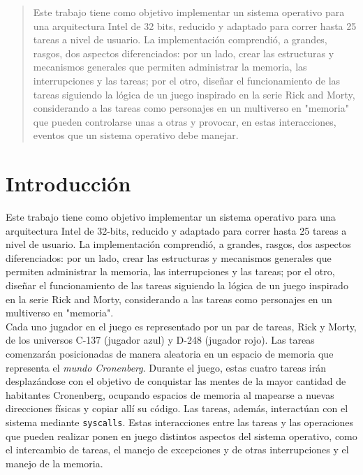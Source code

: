 \documentclass[a4paper]{article}
\begin{document}
\thispagestyle{empty}

\maketitle
\newpage

\thispagestyle{empty}
\vfill
\begin{abstract}
Este trabajo tiene como objetivo implementar un sistema operativo para una arquitectura Intel de 32 bits, reducido y adaptado para correr hasta 25 tareas a nivel de usuario. La implementación comprendió, a grandes, rasgos, dos aspectos diferenciados: por un lado, crear las estructuras y mecanismos generales que permiten administrar la memoria, las interrupciones y las tareas; por el otro, diseñar el funcionamiento de las tareas siguiendo la lógica de un juego inspirado en la serie Rick and Morty, considerando a las tareas como personajes en un multiverso en "memoria" que pueden controlarse unas a otras y provocar, en estas interacciones, eventos que un sistema operativo debe manejar.
\end{abstract}

\newpage
\thispagestyle{empty}
\vspace{3cm}
\tableofcontents

\newpage

\section{Introducción}

Este trabajo tiene como objetivo implementar un sistema operativo para una arquitectura Intel de 32-bits, reducido y adaptado para correr hasta 25 tareas a nivel de usuario. La implementación comprendió, a grandes, rasgos, dos aspectos diferenciados: por un lado, crear las estructuras y mecanismos generales que permiten administrar la memoria, las interrupciones y las tareas; por el otro, diseñar el funcionamiento de las tareas siguiendo la lógica de un juego inspirado en la serie Rick and Morty, considerando a las tareas como personajes en un multiverso en "memoria". \\
Cada uno jugador en el juego es representado por un par de tareas, Rick y Morty, de los universos C-137 (jugador azul) y D-248 (jugador rojo). Las tareas comenzarán posicionadas de manera aleatoria en un espacio de memoria que representa el \textit{mundo Cronenberg}. Durante el juego, estas cuatro tareas irán desplazándose con el objetivo de conquistar las mentes de la mayor cantidad de habitantes Cronenberg, ocupando espacios de memoria al mapearse a nuevas direcciones físicas y copiar allí su código. Las tareas, además, interactúan con el sistema mediante {\tt syscalls}. Estas interacciones entre las tareas y las operaciones que pueden realizar ponen en juego distintos aspectos del sistema operativo, como el intercambio de tareas, el manejo de excepciones y de otras interrupciones y el manejo de la memoria.
\end{document}
